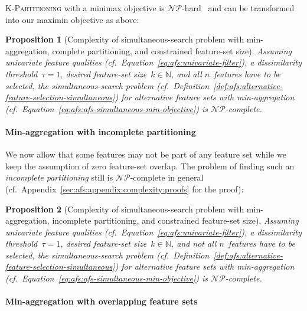 \documentclass{article}
\newtheorem{proposition}{Proposition}
\theoremstyle{definition}
\begin{document}
\textsc{K-Partitioning} with a minimax objective is $\mathcal{NP}$-hard~\cite{babel1998thek} and
can be transformed into our maximin objective as above:
%
\begin{proposition}[Complexity of simultaneous-search problem with min-aggregation, complete partitioning, and constrained feature-set size]
	Assuming univariate feature qualities (cf.~Equation~\ref{eq:afs:univariate-filter}), a dissimilarity threshold~$\tau = 1$, desired feature-set size~$k \in \mathbb{N}$, and all $n$~features have to be selected, the simulta\-neous-search problem (cf.~Definition~\ref{def:afs:alternative-feature-selection-simultaneous}) for alternative feature sets with min-aggregation (cf.~Equation~\ref{eq:afs:afs-simultaneous-min-objective}) is $\mathcal{NP}$-complete.
	\label{prop:afs:complexity-partitioning-min-constrained-k}
\end{proposition}

\paragraph{Min-aggregation with incomplete partitioning}

We now allow that some features may not be part of any feature set while we keep the assumption of zero feature-set overlap.
The problem of finding such an \emph{incomplete partitioning} still is $\mathcal{NP}$-complete in general (cf.~Appendix~\ref{sec:afs:appendix:complexity:proofs} for the proof):
%
\begin{proposition}[Complexity of simultaneous-search problem with min-aggregation, incomplete partitioning, and constrained feature-set size]
	Assuming univariate feature qualities (cf.~Equation~\ref{eq:afs:univariate-filter}), a dissimilarity threshold~$\tau = 1$, desired feature-set size~$k \in \mathbb{N}$, and \emph{not} all $n$~features have to be selected, the simultaneous-search problem (cf.~Definition~\ref{def:afs:alternative-feature-selection-simultaneous}) for alternative feature sets with min-aggregation (cf.~Equation~\ref{eq:afs:afs-simultaneous-min-objective}) is $\mathcal{NP}$-complete.
	\label{prop:afs:complexity-incomplete-partitioning-min-constrained-k}
\end{proposition}

\paragraph{Min-aggregation with overlapping feature sets}
\end{document}
